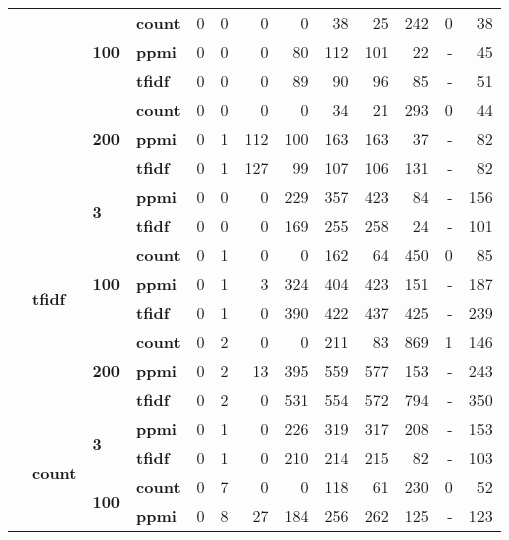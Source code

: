 \begin{table}[h]
{\begin{tabular}{llllrrrrrrrrr}
	\cline{3-4}
	 &  & \multirow[t]{3}{*}{\textbf{100}} & \textbf{count} & 0 & 0 & 0 & 0 & 38 & 25 & 242 & 0 & 38 \\
	 &  &  & \textbf{ppmi} & 0 & 0 & 0 & 80 & 112 & 101 & 22 & - & 45 \\
	 &  &  & \textbf{tfidf} & 0 & 0 & 0 & 89 & 90 & 96 & 85 & - & 51 \\
	\cline{3-4}
	 &  & \multirow[t]{3}{*}{\textbf{200}} & \textbf{count} & 0 & 0 & 0 & 0 & 34 & 21 & 293 & 0 & 44 \\
	 &  &  & \textbf{ppmi} & 0 & 1 & 112 & 100 & 163 & 163 & 37 & - & 82 \\
	 &  &  & \textbf{tfidf} & 0 & 1 & {\cellcolor{lightgreen}} 127 & 99 & 107 & 106 & 131 & - & 82 \\
	\cline{2-4} \cline{3-4}
	 & \multirow[t]{8}{*}{\textbf{tfidf}} & \multirow[t]{2}{*}{\textbf{3}} & \textbf{ppmi} & 0 & 0 & 0 & 229 & 357 & 423 & 84 & - & 156 \\
	 &  &  & \textbf{tfidf} & 0 & 0 & 0 & 169 & 255 & 258 & 24 & - & 101 \\
	\cline{3-4}
	 &  & \multirow[t]{3}{*}{\textbf{100}} & \textbf{count} & 0 & 1 & 0 & 0 & 162 & 64 & 450 & 0 & 85 \\
	 &  &  & \textbf{ppmi} & 0 & 1 & 3 & 324 & 404 & 423 & 151 & - & 187 \\
	 &  &  & \textbf{tfidf} & 0 & 1 & 0 & 390 & 422 & 437 & 425 & - & 239 \\
	\cline{3-4}
	 &  & \multirow[t]{3}{*}{\textbf{200}} & \textbf{count} & 0 & 2 & 0 & 0 & 211 & 83 & {\cellcolor{lightgreen}} 869 & {\cellcolor{lightgreen}} 1 & 146 \\
	 &  &  & \textbf{ppmi} & 0 & 2 & 13 & 395 & {\cellcolor{lightgreen}} 559 & {\cellcolor{lightgreen}} 577 & 153 & - & 243 \\
	 &  &  & \textbf{tfidf} & 0 & 2 & 0 & {\cellcolor{lightgreen}} 531 & 554 & 572 & 794 & - & {\cellcolor{lightgreen}} 350 \\
	\cline{1-4} \cline{2-4} \cline{3-4}
	\multirow[t]{24}{*}{\mfauhtcsldp} & \multirow[t]{8}{*}{\textbf{count}} & \multirow[t]{2}{*}{\textbf{3}} & \textbf{ppmi} & 0 & 1 & 0 & 226 & 319 & 317 & 208 & - & 153 \\
	 &  &  & \textbf{tfidf} & 0 & 1 & 0 & 210 & 214 & 215 & 82 & - & 103 \\
	\cline{3-4}
	 &  & \multirow[t]{3}{*}{\textbf{100}} & \textbf{count} & 0 & 7 & 0 & 0 & 118 & 61 & 230 & 0 & 52 \\
	 &  &  & \textbf{ppmi} & 0 & 8 & 27 & 184 & 256 & 262 & 125 & - & 123 \\

\end{tabular}}
\end{table}
